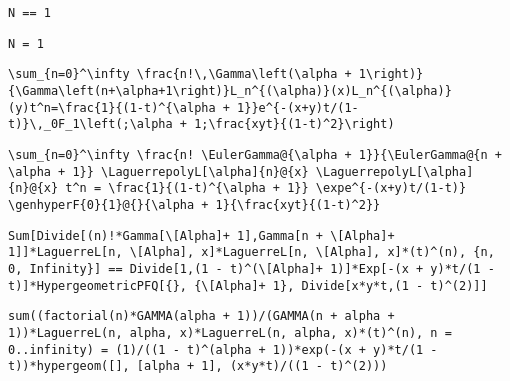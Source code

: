 \newsavebox\BEMM
\begin{lrbox}{\BEMM}
 \begin{minipage}[t]{0.82\textwidth}
  \lstinline[language={[latex]TeX},mathescape,breaklines=true]"N == 1"
 \end{minipage}
\end{lrbox}
\newsavebox\BEMA
\begin{lrbox}{\BEMA}
 \begin{minipage}[t]{0.82\textwidth}
  \lstinline[language={[latex]TeX},mathescape,breaklines=true]"N = 1"
 \end{minipage}
\end{lrbox}
\newsavebox\BFT
\begin{lrbox}{\BFT}
 \begin{minipage}[t]{0.82\textwidth}
  \lstinline[language={[latex]TeX},mathescape,breaklines=true]"\sum_{n=0}^\infty \frac{n!\,\Gamma\left(\alpha + 1\right)}{\Gamma\left(n+\alpha+1\right)}L_n^{(\alpha)}(x)L_n^{(\alpha)}(y)t^n=\frac{1}{(1-t)^{\alpha + 1}}e^{-(x+y)t/(1-t)}\,_0F_1\left(;\alpha + 1;\frac{xyt}{(1-t)^2}\right)"
 \end{minipage}
\end{lrbox}
\newsavebox\BFST
\begin{lrbox}{\BFST}
 \begin{minipage}[t]{0.82\textwidth}
  \lstinline[language={[latex]TeX},mathescape,breaklines=true]"\sum_{n=0}^\infty \frac{n! \EulerGamma@{\alpha + 1}}{\EulerGamma@{n + \alpha + 1}} \LaguerrepolyL[\alpha]{n}@{x} \LaguerrepolyL[\alpha]{n}@{x} t^n = \frac{1}{(1-t)^{\alpha + 1}} \expe^{-(x+y)t/(1-t)} \genhyperF{0}{1}@{}{\alpha + 1}{\frac{xyt}{(1-t)^2}}"
 \end{minipage}
\end{lrbox}
\newsavebox\BFMM
\begin{lrbox}{\BFMM}
 \begin{minipage}[t]{0.82\textwidth}
  \lstinline[language={[latex]TeX},mathescape,breaklines=true]"Sum[Divide[(n)!*Gamma[\[Alpha]+ 1],Gamma[n + \[Alpha]+ 1]]*LaguerreL[n, \[Alpha], x]*LaguerreL[n, \[Alpha], x]*(t)^(n), {n, 0, Infinity}] == Divide[1,(1 - t)^(\[Alpha]+ 1)]*Exp[-(x + y)*t/(1 - t)]*HypergeometricPFQ[{}, {\[Alpha]+ 1}, Divide[x*y*t,(1 - t)^(2)]]"
 \end{minipage}
\end{lrbox}
\newsavebox\BFMA
\begin{lrbox}{\BFMA}
 \begin{minipage}[t]{0.82\textwidth}
  \lstinline[language={[latex]TeX},mathescape,breaklines=true]"sum((factorial(n)*GAMMA(alpha + 1))/(GAMMA(n + alpha + 1))*LaguerreL(n, alpha, x)*LaguerreL(n, alpha, x)*(t)^(n), n = 0..infinity) = (1)/((1 - t)^(alpha + 1))*exp(-(x + y)*t/(1 - t))*hypergeom([], [alpha + 1], (x*y*t)/((1 - t)^(2)))"
 \end{minipage}
\end{lrbox}
